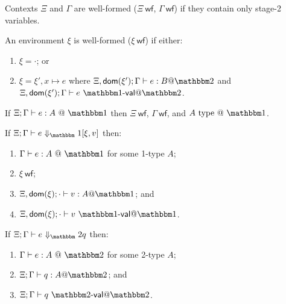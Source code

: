 \newcommand{\wf}{\ \mathsf{wf}}
\newcommand{\valoo}{\ \bbone\textsf{-}\mathsf{val} @ \bbone}
\newcommand{\valot}{\ \bbone\textsf{-}\mathsf{val} @ \bbtwo}
\newcommand{\valtt}{\ \bbtwo\textsf{-}\mathsf{val} @ \bbtwo}

\begin{definition}
Contexts $\Xi$ and $\Gamma$ are well-formed ($\Xi\wf$, $\Gamma\wf$) if they
contain only stage-2 variables.
\end{definition}

\begin{definition}
An environment $\xi$ is well-formed ($\xi\wf$) if either:
\begin{enumerate}
\item $\xi = \cdot$; or
\item $\xi = \xi',x\mapsto e$ where
$\Xi,\dom{\xi'};\Gamma\vdash e : B @ \bbtwo$ and
$\Xi,\dom{\xi'};\Gamma\vdash e \valot$.
\end{enumerate}
\end{definition}

\begin{theorem}
If $\Xi;\typesone e A$ then $\Xi\wf$, $\Gamma\wf$, and $A\istypeone$.
\end{theorem}

\begin{theorem}
If $\diaonesub$ then:
\begin{enumerate}
\item $\typesone e A$ for some 1-type $A$;
\item $\xi\wf$;
\item $\Xi,\dom\xi;\cdot\vdash v : A @ \bbone$; and
\item $\Xi,\dom\xi;\cdot\vdash v\valoo$.
\end{enumerate}
\end{theorem}

\begin{theorem}
If $\diatwosub$ then:
\begin{enumerate}
\item $\typestwo e A$ for some 2-type $A$;
\item $\Xi;\Gamma\vdash q : A @ \bbtwo$; and
\item $\Xi;\Gamma\vdash q\valtt$.
\end{enumerate}
\end{theorem}


